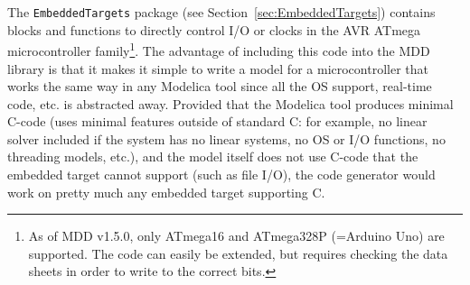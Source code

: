 \documentclass{resources/modelica}
\newcommand{\modelica}[1]{\lstinline[language=modelica]|#1|}
\begin{document}
The \modelica{EmbeddedTargets} package (see Section~\ref{sec:EmbeddedTargets}) contains
blocks and functions to directly control I/O or clocks in the AVR ATmega microcontroller family\footnote{As of MDD
v1.5.0, only ATmega16 and ATmega328P (=Arduino Uno) are supported.
The code can easily be extended, but requires checking the data sheets in order
to write to the correct bits.}.
The advantage of including this code into the MDD library is that it makes it
simple to write a model for a microcontroller that works the same way
in any Modelica tool since all the OS support, real-time code, etc. is
abstracted away.
Provided that the Modelica tool produces minimal C-code (uses minimal features
outside of standard C: for example, no linear solver included if the system has no linear systems,
no OS or I/O functions, no threading models, etc.),
and the model itself does not use C-code that the embedded target cannot support
(such as file I/O), the code generator would work on pretty much any embedded
target supporting C.
\end{document}
